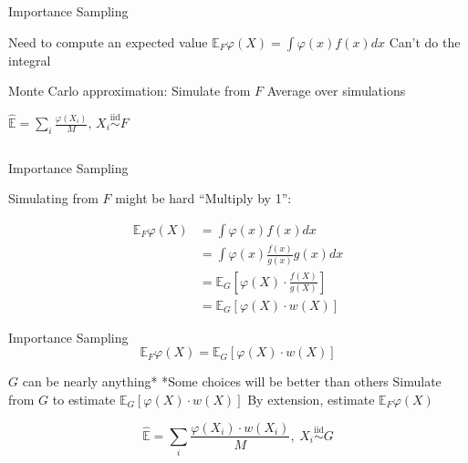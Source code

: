 \documentclass[14pt]{beamer}
\newcommand{\bE}{\mathbb{E}}
\begin{document}
\begin{frame}{Importance Sampling}
    \begin{outline}
        \1 Need to compute an expected value
            \2 $\bE_F \varphi(X) = \int \varphi(x) f(x) dx$
        \1 Can't do the integral \newline

        \1 Monte Carlo approximation:
            \2 Simulate from $F$
            \2 Average over simulations \newline

        \1 $\hat{\bE} = \sum_i \frac{\varphi(X_i)}{M}$, $X_i \overset{\mathrm{iid}}{\sim} F$
    \end{outline}
    \begin{equation*}
    \end{equation*}
\end{frame}

\begin{frame}{Importance Sampling}
    \begin{outline}
        \1 Simulating from $F$ might be hard
        \1 ``Multiply by 1'':
    \end{outline}
    \begin{align*}
        \bE_F \varphi(X) &= \int \varphi(x) f(x) dx\\
        & = \int \varphi(x) \frac{f(x)}{g(x)} g(x) dx\\
        &= \bE_G \left[ \varphi(X) \cdot \frac{f(X)}{g(X)} \right]\\
        &= \bE_G \left[ \varphi(X) \cdot w(X) \right]
    \end{align*}
    
\end{frame}

\begin{frame}{Importance Sampling}
    \begin{equation*}
        \bE_F \varphi(X) = \bE_G \left[ \varphi(X) \cdot w(X) \right]
    \end{equation*}
    \vspace{-0.5cm}
    \begin{outline}
        \1 $G$ can be nearly anything*
            \2 *Some choices will be better than others
        \1 Simulate from $G$ to estimate $\bE_G \left[ \varphi(X) \cdot w(X) \right]$
            \2 By extension, estimate $\bE_F \varphi(X)$ \newline
    \end{outline}  
    \begin{equation*}
        \hat{\bE} = \sum_i \frac{\varphi(X_i) \cdot w(X_i)}{M} \mathrm{,} \hspace{3pt} X_i \overset{\mathrm{iid}}{\sim} G
    \end{equation*}  
\end{frame}
\end{document}

